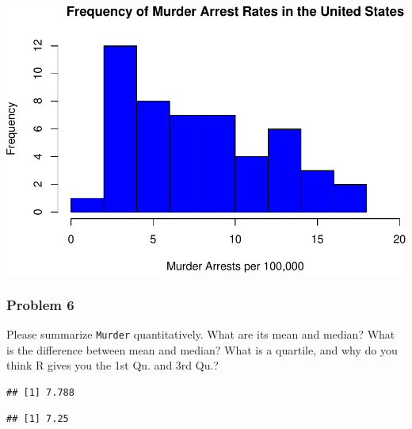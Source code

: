 \documentclass[
]{article}
\newenvironment{Shaded}{\begin{snugshade}}{\end{snugshade}}
\newcommand{\FunctionTok}[1]{\textcolor[rgb]{0.00,0.00,0.00}{#1}}
\newcommand{\NormalTok}[1]{#1}
\newcommand{\SpecialCharTok}[1]{\textcolor[rgb]{0.00,0.00,0.00}{#1}}
\begin{document}
\includegraphics{Assignments_files/figure-latex/unnamed-chunk-7-1.pdf}

\hypertarget{problem-6}{%
\subsubsection{Problem 6}\label{problem-6}}

Please summarize \texttt{Murder} quantitatively. What are its mean and
median? What is the difference between mean and median? What is a
quartile, and why do you think R gives you the 1st Qu. and 3rd Qu.?

\begin{Shaded}
\end{Shaded}

\begin{verbatim}
## [1] 7.788
\end{verbatim}

\begin{Shaded}
\end{Shaded}

\begin{verbatim}
## [1] 7.25
\end{verbatim}

\begin{Shaded}
\end{Shaded}
\end{document}
